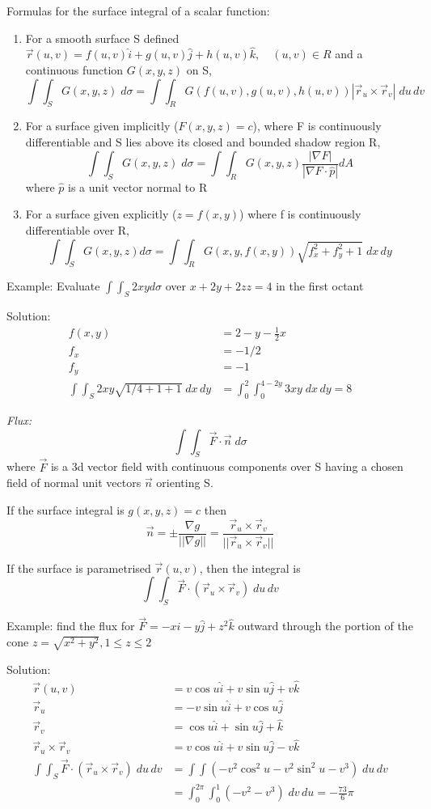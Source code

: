 \documentclass[12pt]{article}
\begin{document}
Formulas for the surface integral of a scalar function:
\begin{enumerate}
    \item For a smooth surface S defined $\vec{r}(u,v) = f(u,v) \hat{i} + g(u,v) \hat{j} + h(u,v) \hat{k}, \quad (u,v) \in R$ and a continuous function $G(x,y,z)$ on S,
    \[\int \int_S G(x,y,z) \; d\sigma = \int \int_R G(f(u,v), g(u,v), h(u,v)) |\vec{r}_u \times \vec{r}_v| \; du\, dv\]
    \item For a surface given implicitly ($F(x,y,z) = c$), where F is continuously differentiable and S lies above its closed and bounded shadow region R, 
    \[\int \int_S G(x,y,z) \; d\sigma = \int \int_R G(x,y,z) \frac{|\nabla F|}{|\nabla F \cdot \hat{p}|} dA\]
    where $\hat{p}$ is a unit vector normal to R
    \item For a surface given explicitly ($z = f(x,y)$) where f is continuously differentiable over R, 
    \[\int \int_S G(x,y,z) d\sigma = \int \int_R G(x,y, f(x,y)) \sqrt{f_x^2 + f_y^2 + 1} \; dx \, dy\]
\end{enumerate}

Example: Evaluate $\int \int_S 2xy d\sigma$ over $x + 2y + 2zz =4$ in the first octant

Solution: 
\begin{align*}
    f(x,y) &= 2 - y - \frac{1}{2}x\\
    f_x &= -1/2\\
    f_y &= -1\\
    \int \int_S 2xy\sqrt{1/4 + 1 + 1} \; dx \, dy &= \int_0^2 \int_0^{4-2y} 3xy \; dx\, dy = 8
\end{align*}

\emph{Flux:} 
\[\int \int_S \vec{F} \cdot \vec{n} \; d\sigma\]
where $\vec{F}$ is a 3d vector field with continuous components over S having a chosen field of normal unit vectors $\vec{n}$ orienting S.

If the surface integral is $g(x,y,z) = c$ then 
\[\vec{n} = \pm \frac{\nabla g}{||\nabla g||} = \frac{\vec{r}_u \times \vec{r}_v}{||\vec{r}_u \times \vec{r}_v||}\]

If the surface is parametrised $\vec{r}(u,v)$, then the integral is 
\[\int \int_S \vec{F} \cdot (\vec{r}_u \times \vec{r}_v) \; du\, dv\]

Example: find the flux for $\vec{F} = -x \hat{i} - y\hat{j} +z^2 \hat{k}$ outward through the portion of the cone $z = \sqrt{x^2 + y^2}, 1 \leq z \leq 2$

Solution:
\begin{align*}
    \vec{r}(u,v) &= v\cos u \hat{i} + v \sin u \hat{j} + v \hat{k} \\
    \vec{r}_u &= - v\sin u \hat{i} + v\cos u \hat{j}\\
    \vec{r}_v &= \cos u \hat{i} + \sin u \hat{j} + \hat{k}\\
    \vec{r}_u \times \vec{r}_v &= v\cos u \hat{i} + v\sin u \hat{j} - v\hat{k}\\
    \int \int_S \vec{F} \cdot (\vec{r}_u \times \vec{r}_v) \; du \, dv &= \int \int (-v^2 \cos^2 u- v^2 \sin^2 u - v^3)\; du\, dv \\
    &= \int_0^{2\pi} \int_0^1 (-v^2 - v^3) \; dv \, du = -\frac{73}{6}\pi
\end{align*}
\end{document}
